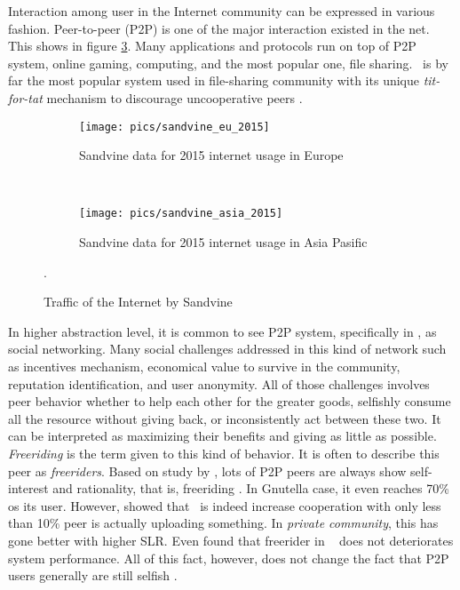 Interaction among user in the Internet community can be expressed in various fashion. Peer-to-peer (P2P) is one of the major interaction existed in the net. This shows in figure \ref{fig:usage}. Many applications and protocols run on top of P2P system, online gaming, computing, and the most popular one, file sharing. \bt~is by far the most popular system used in file-sharing community with its unique \textit{tit-for-tat} mechanism to discourage uncooperative peers \cite{2003:bittorrent:cohen}. 

\begin{figure}[h]
	\centering
	\begin{subfigure}[b]{0.8\textwidth}
		\texttt{[image: pics/sandvine\_eu\_2015]}
		\caption{Sandvine data for 2015 internet usage in Europe}
		\label{fig:usage1}
	\end{subfigure}\\
		\begin{subfigure}[b]{0.8\textwidth}
			\texttt{[image: pics/sandvine\_asia\_2015]}
			\caption{Sandvine data for 2015 internet usage in Asia Pasific}
			\label{fig:usage2}
		\end{subfigure}%
	\caption{Traffic of the Internet by Sandvine \cite{2015:internettraffic:sandvine}}.
	\label{fig:usage}
\end{figure}

In higher abstraction level, it is common to see P2P system, specifically in \bt, as social networking. Many social challenges addressed in this kind of network such as incentives mechanism, economical value to survive in the community, reputation identification, and user anonymity. All of those challenges involves peer behavior whether to help each other for the greater goods, selfishly consume all the resource without giving back, or inconsistently act between these two. It can be interpreted as maximizing their benefits and giving as little as possible. \textit{Freeriding} is the term given to this kind of behavior. It is often to describe this peer as \textit{freeriders}. Based on study by \citeauthor{2000:freeridegnutella:adar}, lots of P2P peers are always show self-interest and rationality, that is, freeriding \cite{2000:freeridegnutella:adar}. In Gnutella case, it even reaches 70\% os its user.  However, \citeauthor{2005:bittorrentcooperation:andrade} showed that \bt~is indeed increase cooperation with only less than 10\% peer is actually uploading something. In \textit{private community}, this has gone better with higher SLR. Even \citeauthor{2015:freeriderinbtcommunity:das} found that freerider in \bt~ does not deteriorates system performance\cite{2015:freeriderinbtcommunity:das}. All of this fact, however, does not change the fact that P2P users generally are still selfish \cite{2014:userbehaviourprivate:jia}. 

